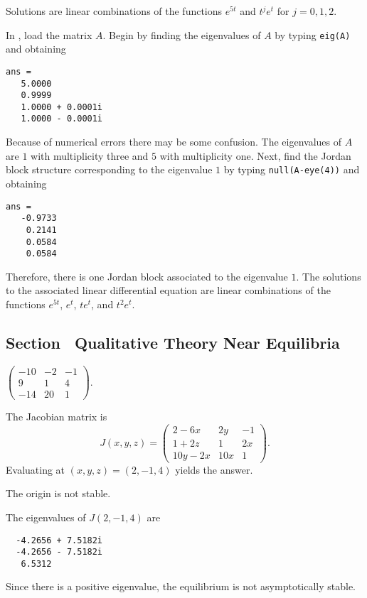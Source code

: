  \ans Solutions are linear combinations of the functions 
$e^{5t}$ and $t^je^t$ for $j=0,1,2$.

\soln In \Matlabp, load the matrix $A$.  Begin by 
finding the eigenvalues of $A$ by typing {\tt eig(A)} and obtaining
\begin{verbatim}
ans =
   5.0000          
   0.9999          
   1.0000 + 0.0001i
   1.0000 - 0.0001i
\end{verbatim}
Because of numerical errors there may be some confusion.  The eigenvalues of
$A$ are $1$ with multiplicity three and $5$ with multiplicity one.  Next,
find the Jordan block structure corresponding to the eigenvalue $1$ by typing
{\tt null(A-eye(4))} and obtaining
\begin{verbatim}
ans =
   -0.9733
    0.2141
    0.0584
    0.0584
\end{verbatim}
Therefore, there is one Jordan block associated to the eigenvalue $1$.  The
solutions to the associated linear differential equation are linear
combinations of the functions $e^{5t}$, $e^t$, $te^t$, and $t^2e^t$.



\subsection*{Section~\protect{\ref{S:QT}} Qualitative Theory Near Equilibria}


 \ans $\left(\begin{array}{rrr}
-10 & -2 & -1\\ 9 & 1 & 4 \\ -14 & 20 & 1\end{array}\right)$.

\vspace{0.08in}

\soln  The Jacobian matrix is
\[
J(x,y,z) = \left(\begin{array}{ccc}
2 - 6x & 2y & -1\\ 1+2z & 1 & 2x\\ 10y-2x & 10x & 1\end{array}\right).
\]
Evaluating at $(x,y,z)=(2,-1,4)$ yields the answer.

 \ans The origin is not stable.

\soln The eigenvalues of $J(2,-1,4)$ are
\begin{verbatim}
  -4.2656 + 7.5182i
  -4.2656 - 7.5182i
   6.5312          
\end{verbatim}
Since there is a positive eigenvalue, the equilibrium is not 
asymptotically stable.


